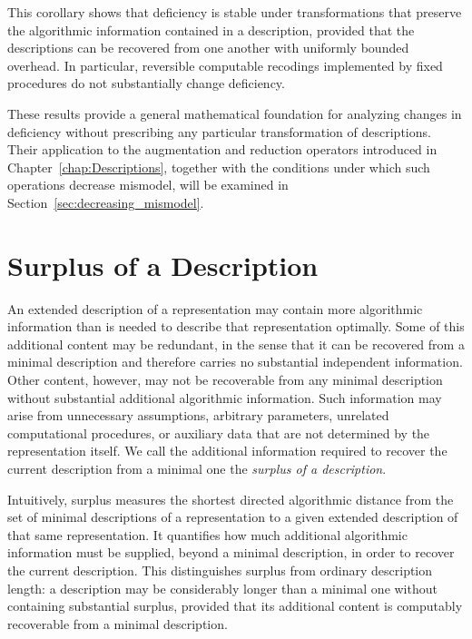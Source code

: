 This corollary shows that deficiency is stable under transformations that preserve the algorithmic information contained in a description, provided that the descriptions can be recovered from one another with uniformly bounded overhead. In particular, reversible computable recodings implemented by fixed procedures do not substantially change deficiency.

These results provide a general mathematical foundation for analyzing changes in deficiency without prescribing any particular transformation of descriptions. Their application to the augmentation and reduction operators introduced in Chapter~\ref{chap:Descriptions}, together with the conditions under which such operations decrease mismodel, will be examined in Section~\ref{sec:decreasing_mismodel}.

%
%

\section{Surplus of a Description}
\label{sec:surplus_description}

An extended description of a representation may contain more algorithmic information than is needed to describe that representation optimally. Some of this additional content may be redundant, in the sense that it can be recovered from a minimal description and therefore carries no substantial independent information. Other content, however, may not be recoverable from any minimal description without substantial additional algorithmic information. Such information may arise from unnecessary assumptions, arbitrary parameters, unrelated computational procedures, or auxiliary data that are not determined by the representation itself. We call the additional information required to recover the current description from a minimal one the \emph{surplus of a description}.

Intuitively, surplus measures the shortest directed algorithmic distance from the set of minimal descriptions of a representation to a given extended description of that same representation. It quantifies how much additional algorithmic information must be supplied, beyond a minimal description, in order to recover the current description. This distinguishes surplus from ordinary description length: a description may be considerably longer than a minimal one without containing substantial surplus, provided that its additional content is computably recoverable from a minimal description.

